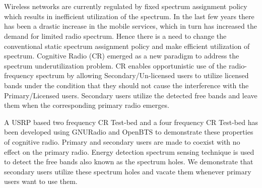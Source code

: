 \chapter*{}
Wireless networks are currently regulated by fixed spectrum assignment policy
which results in inefficient utilization of the spectrum. In the last few
years there has been a drastic increase in the mobile services, which in turn
has increased the demand for limited radio spectrum. Hence there is a need to
change the conventional static spectrum assignment policy and make efficient
utilization of spectrum. Cognitive Radio (CR) emerged as a new paradigm to
address the spectrum underutilization problem.  CR enables opportunistic use
of the radio-frequency spectrum by allowing Secondary/Un-licensed users to
utilize licensed bands under the condition that they should not cause the
interference with the Primary/Licensed users. Secondary users utilize the
detected free bands and leave them when the corresponding primary radio
emerges.

A USRP based two frequency CR Test-bed and a four frequency CR Test-bed has been
developed using GNURadio and OpenBTS to demonstrate these properties of
cognitive radio. Primary and secondary users are made to coexist with no
effect on the primary radio. Energy detection spectrum sensing technique is
used to detect the free bands also known as the spectrum holes. We demonstrate
that secondary users utilize these spectrum holes and vacate them whenever
primary users want to use them.
